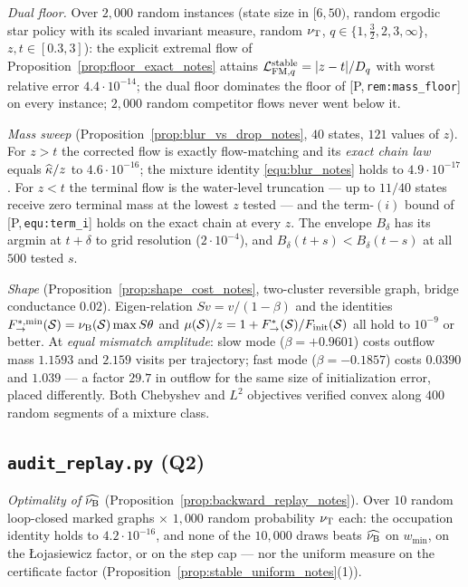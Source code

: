 \documentclass[11pt]{article}
\theoremstyle{definition}
\theoremstyle{remark}
\def\lambda{\widehat\nuB}
\newcommand{\paperref}[1]{[P,\,\texttt{#1}]}   %
\begin{document}
\emph{Dual floor.} Over $2{,}000$ random instances (state size in $[6,50)$, random
ergodic star policy with its scaled invariant measure, random $\nu_{\mathrm{T}}$,
$q\in\{1,\frac32,2,3,\infty\}$, $z,t\in[0.3,3]$): the explicit extremal flow of
Proposition~\ref{prop:floor_exact_notes} attains $\mathcal L_{\mathrm{FM},q}^{\mathrm{stable}}=|z-t|/D_{q}$ with worst relative
error $4.4\cdot10^{-14}$; the dual floor dominates the floor of \paperref{rem:mass\_floor}
on every instance; $2{,}000$ random competitor flows never went below it.

\emph{Mass sweep} (Proposition~\ref{prop:blur_vs_drop_notes}, $40$ states, $121$ values of
$z$). For $z>t$ the corrected flow is exactly flow-matching and its \emph{exact chain
law} equals $\widehat{\kappa}/z$ to $4.6\cdot10^{-16}$; the mixture identity
\eqref{equ:blur_notes} holds to $4.9\cdot10^{-17}$. For $z<t$ the terminal flow is the
water-level truncation --- up to $11/40$ states receive zero terminal mass at the lowest
$z$ tested --- and the term-$(i)$ bound of \paperref{equ:term\_i} holds on the exact
chain at every $z$. The envelope $B_\delta$ has its argmin at $t+\delta$ to grid
resolution ($2\cdot10^{-4}$), and $B_\delta(t+s)<B_\delta(t-s)$ at all $500$ tested $s$.

\emph{Shape} (Proposition~\ref{prop:shape_cost_notes}, two-cluster reversible graph, bridge
conductance $0.02$). Eigen-relation $Sv=v/(1-\beta)$ and the identities
$F^{*,\min}_{\rightarrow}(\mathcal S)=\nu_{\mathrm{B}}(\mathcal S)\max S\theta$ and
$\mu(\mathcal S)/z=1+F^*_{\rightarrow}(\mathcal S)/F_{\mathrm{init}}(\mathcal S)$ all hold to
$10^{-9}$ or better. At \emph{equal mismatch amplitude}: slow mode
($\beta=+0.9601$) costs outflow mass $1.1593$ and $2.159$ visits per trajectory; fast
mode ($\beta=-0.1857$) costs $0.0390$ and $1.039$ --- a factor $29.7$ in outflow for the
same size of initialization error, placed differently. Both Chebyshev and $L^2$
objectives verified convex along $400$ random segments of a mixture class.

\subsection{\texttt{audit\_replay.py} (Q2)}\label{sec:num_replay_notes}

\emph{Optimality of $\lambda$} (Proposition~\ref{prop:backward_replay_notes}). Over $10$
random loop-closed marked graphs $\times$ $1{,}000$ random probability $\nu_{\mathrm{T}}$ each:
the occupation identity holds to $4.2\cdot10^{-16}$, and none of the $10{,}000$ draws
beats $\lambda$ on $w_{\min}$, on the \L ojasiewicz factor, or on the step cap --- nor
the uniform measure on the certificate factor (Proposition~\ref{prop:stable_uniform_notes}(1)).
\end{document}
